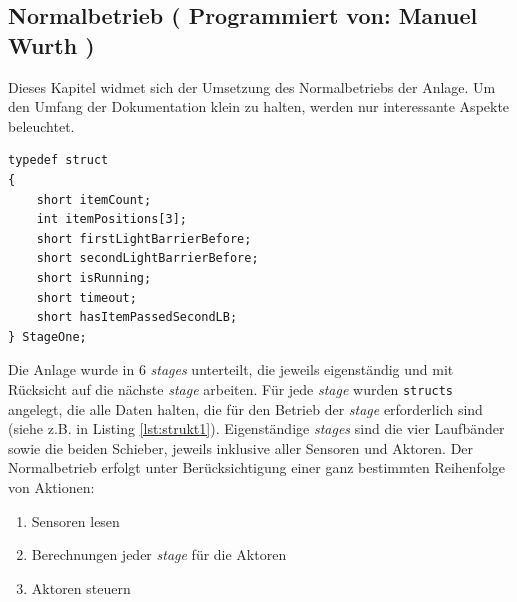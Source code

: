 \documentclass[fontsize=11pt,a4paper,final]{scrartcl}[2003/01/01]
\newcommand*{\manu}{%
	Programmiert von: Manuel Wurth
}
\begin{document}
\subsection{Normalbetrieb (\manu)}
Dieses Kapitel widmet sich der Umsetzung des Normalbetriebs der Anlage. Um den Umfang der Dokumentation klein zu halten, werden nur interessante Aspekte beleuchtet.
\begin{lstlisting}[caption={Beispiel: Struct für die erste \textit{stage} (erstes Laufband)},label={lst:strukt1}]
typedef struct
{
	short itemCount;
	int itemPositions[3];
	short firstLightBarrierBefore;
	short secondLightBarrierBefore;
	short isRunning;
	short timeout;
	short hasItemPassedSecondLB;
} StageOne;
\end{lstlisting} 
Die Anlage wurde in 6 \textit{stages} unterteilt, die jeweils eigenständig und mit Rücksicht auf die nächste \textit{stage} arbeiten. Für jede \textit{stage} wurden \lstinline|structs| angelegt, die alle Daten halten, die für den Betrieb der \textit{stage} erforderlich sind (siehe z.B. in Listing \ref{lst:strukt1}). Eigenständige \textit{stages} sind die vier Laufbänder sowie die beiden Schieber, jeweils inklusive aller Sensoren und Aktoren. Der Normalbetrieb erfolgt unter Berücksichtigung einer ganz bestimmten Reihenfolge von Aktionen:
\begin{enumerate}
\item Sensoren lesen
\item Berechnungen jeder \textit{stage} für die Aktoren
\item Aktoren steuern
\end{enumerate}
\end{document}
